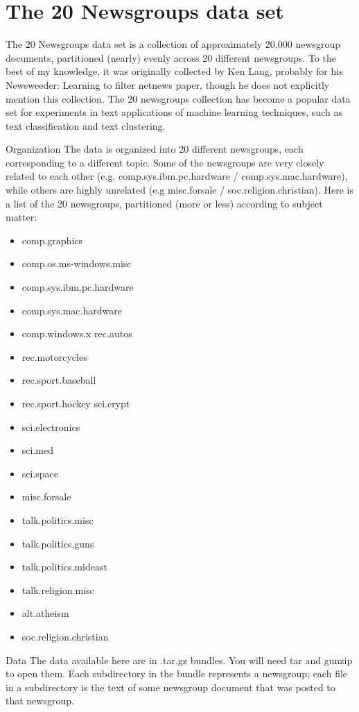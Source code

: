 \documentclass[uplatex,dvipdfmx]{jsarticle}
\begin{document}
\section{The 20 Newsgroups data set}

The 20 Newsgroups data set is a collection of approximately 20,000 newsgroup documents, partitioned (nearly) evenly across 20 different newsgroups. To the best of my knowledge, it was originally collected by Ken Lang, probably for his Newsweeder: Learning to filter netnews paper, though he does not explicitly mention this collection. The 20 newsgroups collection has become a popular data set for experiments in text applications of machine learning techniques, such as text classification and text clustering.

Organization
The data is organized into 20 different newsgroups, each corresponding to a different topic. Some of the newsgroups are very closely related to each other (e.g. comp.sys.ibm.pc.hardware / comp.sys.mac.hardware), while others are highly unrelated (e.g misc.forsale / soc.religion.christian). Here is a list of the 20 newsgroups, partitioned (more or less) according to subject matter:
\begin{itemize}
\item comp.graphics
\item comp.os.ms-windows.misc
\item comp.sys.ibm.pc.hardware
\item comp.sys.mac.hardware
\item comp.windows.x	rec.autos
\item rec.motorcycles
\item rec.sport.baseball
\item rec.sport.hockey	sci.crypt
\item sci.electronics
\item sci.med
\item sci.space
\item misc.forsale
\item talk.politics.misc
\item talk.politics.guns
\item talk.politics.mideast
\item talk.religion.misc
\item alt.atheism
\item soc.religion.christian
\end{itemize}

Data
The data available here are in .tar.gz bundles. You will need tar and gunzip to open them. Each subdirectory in the bundle represents a newsgroup; each file in a subdirectory is the text of some newsgroup document that was posted to that newsgroup.
\end{document}
